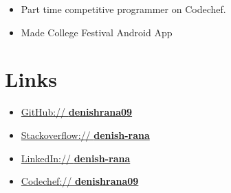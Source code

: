 \documentclass[11pt,a4paper,sans]{moderncv}        %
\begin{document}
\vspace{6pt}

\begin{itemize}

\item{Part time competitive programmer on Codechef.}

\vspace{4pt}

\item{Made College Festival Android App }\vspace{6pt}

\end{itemize}

\section{Links}

\vspace{6pt}
 
\begin{itemize}

\item{\href{https://github.com/denishrana09}{GitHub:// \textbf{denishrana09}}}\vspace{4pt}

\item \href{https://stackoverflow.com/users/8018480/denish-rana}{Stackoverflow:// \textbf{denish-rana}}\vspace{4pt}
\item \href{https://www.linkedin.com/in/denish-rana/}{LinkedIn:// \textbf{denish-rana}}\vspace{6pt}
\item \href{https://www.codechef.com/users/denishrana09}{Codechef:// \textbf{denishrana09}}\vspace{4pt}

\end{itemize}

\nocite{*}

\end{document}
